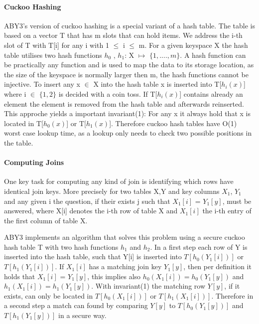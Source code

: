 \paragraph{ Cuckoo Hashing }
ABY3's version of cuckoo hashing is a special variant of a hash table. The table is based on a vector T that has m slots that can hold items. We address the i-th slot of T with T[i] for any i with 1 $\leq$ i $ \leq $ m. For a given keyspace X the hash table utilises two hash functions $ h_0 $ , $ h_1 $: X $ \mapsto $   $ \{ 1,....,m \} $. A hash function can be practically any function and is used to map the data to its storage location, as the size of the keyspace is normally larger then m, the hash functions cannot be injective.
To insert any x $ \in $ X into the hash table x is inserted into T[$h_i(x)$] where i $ \in $ $ \{ 1,2 \} $ is decided with a coin toss. If T[$h_i(x)$] contains already an element the element is removed from the hash table and afterwards reinserted. This approche yields a important invariant(1): For any x it always hold that x is located in T[$h_0(x)$] or T[$h_1(x)$]. Therefore cuckoo hash tables have O(1) worst case lookup time, as a lookup only needs to check two possible positions in the table. 
\paragraph{Computing Joins}
One key task for computing any kind of join is identifying which rows have identical join keys. More precisely for two tables X,Y and key columns $X_1$, $Y_1$ and any given i the question, if their exists j such that $X_1[i]$ = $Y_1[y]$, must be answered, where X[i] denotes the i-th row of table X and $ X_1[i] $ the i-th entry of the first column of table X. 

ABY3 implements an algorithm that solves this problem using a secure cuckoo hash table T with two hash functions $ h_1 $ and $h_2$. 
In a first step each row of Y is inserted into the hash table, such that Y[i] is inserted into $ T[h_0(Y_1 [i]  )] $ or $T[h_1(Y_1 [i]  )] $. 
If $X_1[i]$ has a matching join key $Y_1[y]$, then per definition it holds that  $X_1[i]$ = $Y_1[y]$, this implies also $ h_0(X_1[i]) = h_0(Y_1[y])$ and $ h_1(X_1[i]) = h_1(Y_1[y])$. With invariant(1) the matching row $Y[y]$, if it exists, can only be located in $ T[h_0(X_1[i])] $ or $T[h_1( X_1[i])] $. 
Therefore in a second step a match can found by comparing $Y[y]$ to $ T[h_0(Y_1[y])] $ and $T[h_1(Y_1[y])] $ in a secure way. 

